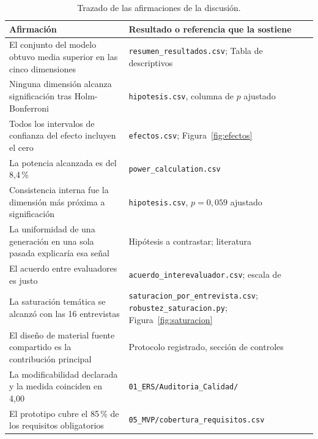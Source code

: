 \documentclass[11pt,a4paper]{article}
\begin{document}
\begin{table}[H]\centering\small
\caption{Trazado de las afirmaciones de la discusi\'on.}
\label{tab:correspondencia}
\begin{tabular}{p{7.6cm}p{6.6cm}}
\toprule
\textbf{Afirmaci\'on} & \textbf{Resultado o referencia que la sostiene} \\
\midrule
El conjunto del modelo obtuvo media superior en las cinco dimensiones & \texttt{resumen\_resultados.csv}; Tabla de descriptivos \\
Ninguna dimensi\'on alcanza significaci\'on tras Holm-Bonferroni & \texttt{hipotesis.csv}, columna de $p$ ajustado \\
Todos los intervalos de confianza del efecto incluyen el cero & \texttt{efectos.csv}; Figura~\ref{fig:efectos} \\
La potencia alcanzada es del 8,4\,\% & \texttt{power\_calculation.csv} \\
Consistencia interna fue la dimensi\'on m\'as pr\'oxima a significaci\'on & \texttt{hipotesis.csv}, $p = 0{,}059$ ajustado \\
La uniformidad de una generaci\'on en una sola pasada explicar\'ia esa se\~nal & Hip\'otesis a contrastar; literatura~\cite{ronanki2023investigating,gorer2023generating} \\
El acuerdo entre evaluadores es justo & \texttt{acuerdo\_interevaluador.csv}; escala de~\cite{landis1977measurement} \\
La saturaci\'on tem\'atica se alcanz\'o con las 16 entrevistas & \texttt{saturacion\_por\_entrevista.csv}; \texttt{robustez\_saturacion.py}; Figura~\ref{fig:saturacion} \\
El dise\~no de material fuente compartido es la contribuci\'on principal & Protocolo registrado, secci\'on de controles \\
La modificabilidad declarada y la medida coinciden en 4,00 & \texttt{01\_ERS/Auditoria\_Calidad/} \\
El prototipo cubre el 85\,\% de los requisitos obligatorios & \texttt{05\_MVP/cobertura\_requisitos.csv} \\
\bottomrule
\end{tabular}
\end{table}
\end{document}
